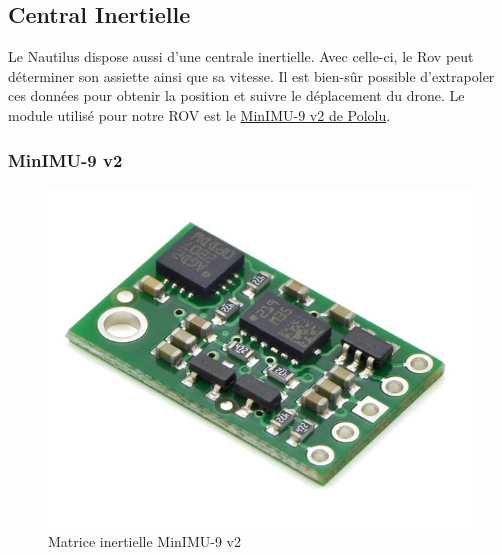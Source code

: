 \documentclass[a4paper,11pt]{report}
\begin{document}
			\newpage
					
		\subsection{Central Inertielle}
		
		Le Nautilus dispose aussi d'une centrale inertielle. Avec celle-ci, le Rov peut déterminer son assiette ainsi que sa vitesse. Il est bien-sûr possible d'extrapoler ces données pour obtenir la position et suivre le déplacement du drone. Le module utilisé pour notre ROV est le \href{https://www.pololu.com/product/1268}{MinIMU-9 v2 de Pololu}.\newline
			\subsubsection{MinIMU-9 v2}\newline
			\begin{figure}[!h]
					\begin{center}
						\includegraphics[scale=0.5]{Photos/Capture31.jpg}
						\caption{Matrice inertielle MinIMU-9 v2}
					\end{center}
				\end{figure}
				\newline
\end{document}
